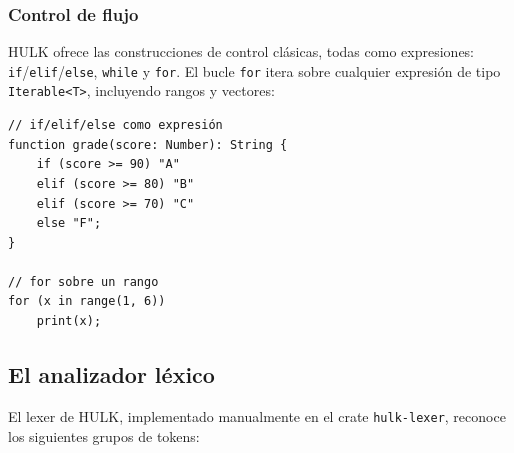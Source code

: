 \documentclass[12pt, a4paper]{article}
\begin{document}
\subsubsection{Control de flujo}

HULK ofrece las construcciones de control clásicas, todas como expresiones:
\texttt{if}/\texttt{elif}/\texttt{else}, \texttt{while} y \texttt{for}.
El bucle \texttt{for} itera sobre cualquier expresión de tipo \texttt{Iterable<T>},
incluyendo rangos y vectores:

\begin{lstlisting}[caption={Control de flujo en HULK}, label=lst:control]
// if/elif/else como expresión
function grade(score: Number): String {
    if (score >= 90) "A"
    elif (score >= 80) "B"
    elif (score >= 70) "C"
    else "F";
}

// for sobre un rango
for (x in range(1, 6))
    print(x);
\end{lstlisting}

\subsection{El analizador léxico}

El lexer de HULK, implementado manualmente en el crate \texttt{hulk-lexer},
reconoce los siguientes grupos de tokens:
\end{document}
